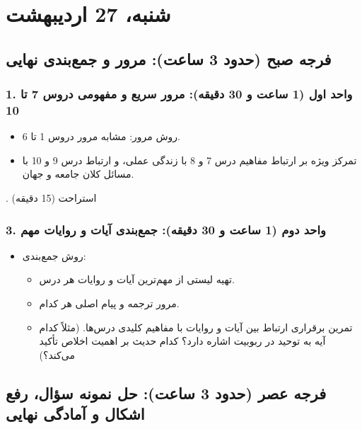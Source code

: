 \documentclass{article}
\begin{document}
\bigskip
\hrulefill
\bigskip

\section*{شنبه، 27 اردیبهشت}

\subsection*{فرجه صبح (حدود 3 ساعت): مرور و جمع‌بندی نهایی}

\subsubsection*{1. واحد اول (1 ساعت و 30 دقیقه): مرور سریع و مفهومی دروس 7 تا 10}
\begin{itemize}
    \item روش مرور: مشابه مرور دروس 1 تا 6.
    \item تمرکز ویژه بر ارتباط مفاهیم درس 7 و 8 با زندگی عملی، و ارتباط درس 9 و 10 با مسائل کلان جامعه و جهان.
\end{itemize}

\vspace{\baselineskip}
. استراحت (15 دقیقه)
\vspace{\baselineskip}

\subsubsection*{3. واحد دوم (1 ساعت و 30 دقیقه): جمع‌بندی آیات و روایات مهم}
\begin{itemize}
    \item روش جمع‌بندی:
    \begin{itemize}
        \item تهیه لیستی از مهم‌ترین آیات و روایات هر درس.
        \item مرور ترجمه و پیام اصلی هر کدام.
        \item تمرین برقراری ارتباط بین آیات و روایات با مفاهیم کلیدی درس‌ها. (مثلاً کدام آیه به توحید در ربوبیت اشاره دارد؟ کدام حدیث بر اهمیت اخلاص تأکید می‌کند؟)
    \end{itemize}
\end{itemize}

\bigskip
\hrulefill
\bigskip

\subsection*{فرجه عصر (حدود 3 ساعت): حل نمونه سؤال، رفع اشکال و آمادگی نهایی}
\end{document}
